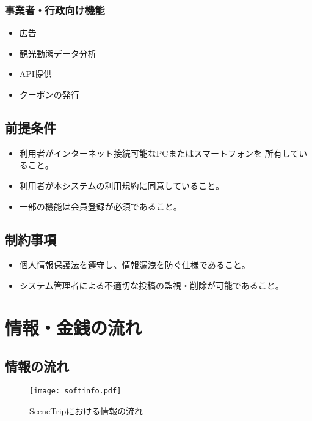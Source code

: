 \documentclass{docs}
\begin{document}
\subsubsection{事業者・行政向け機能}
\begin{itemize}
	\item 広告
	\item 観光動態データ分析
	\item API提供
	\item クーポンの発行
\end{itemize}

\subsection{前提条件}
\begin{itemize}
	\item 利用者がインターネット接続可能なPCまたはスマートフォンを
	所有していること。
	\item 利用者が本システムの利用規約に同意していること。
	\item 一部の機能は会員登録が必須であること。
\end{itemize}

\subsection{制約事項}
\begin{itemize}
	\item 個人情報保護法を遵守し、情報漏洩を防ぐ仕様であること。
	\item システム管理者による不適切な投稿の監視・削除が可能であること。
\end{itemize}

\section{情報・金銭の流れ}
\subsection{情報の流れ}
\begin{figure}[H]
	\centering
	\texttt{[image: softinfo.pdf]}
	\caption{SceneTripにおける情報の流れ}\label{fig:info}
\end{figure}
\end{document}
